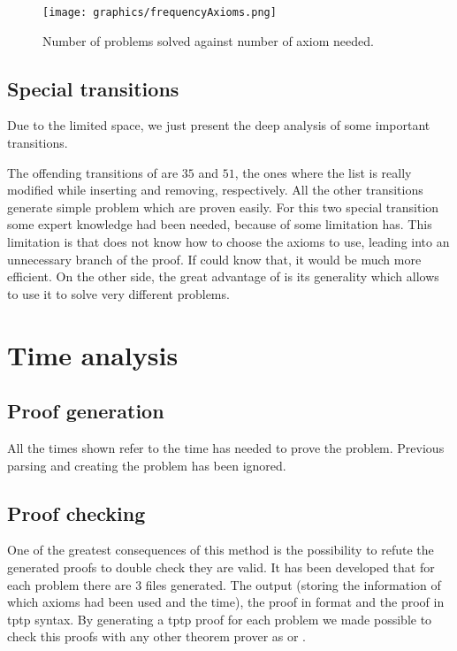 \begin{figure}[hbtp]
\centering
\texttt{[image: graphics/frequencyAxioms.png]}
\caption{Number of problems solved against number of axiom needed.}
\label{fig:frequencyAxioms}
\end{figure}

\subsection{Special transitions}

Due to the limited space, we just present the deep analysis of some important transitions.

The offending transitions of \invPreserve are $35$ and $51$, the ones where the list is really modified while inserting and removing, respectively.
%
All the other transitions generate simple \spass problem which are proven easily.
%
For this two special transition some expert knowledge had been needed, because of some limitation \spass has.
%
This limitation is that \spass does not know how to choose the axioms to use, leading into an unnecessary branch of the proof. 
%
If \spass could know that, it would be much more efficient. 
%
On the other side, the great advantage of \spass is its generality which allows to use it to solve very different problems. 


\section{Time analysis}
\label{sec:timeanalysis}

\subsection{Proof generation}

All the times shown refer to the time \spass has needed to prove the problem. 
%
Previous parsing and creating the \spass problem has been ignored.



\subsection{Proof checking}

One of the greatest consequences of this method is the possibility to refute the generated proofs to double check they are valid.
%
It has been developed that for each \spass problem there are 3 files generated. The \spass output (storing the information of which axioms had been used and the time), the \spass proof in \spass format and the \spass proof in \gls{tptp} syntax.
%
By generating a tptp proof for each \spass problem we made possible to check this proofs with any other theorem prover as  or .

